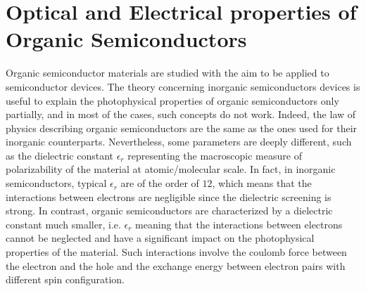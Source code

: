 \documentclass  [
  paper    = a4,
  BCOR     = 10mm,
  twoside,
  fontsize = 12pt,
  fleqn,
  toc      = bibnumbered,
  toc      = listofnumbered,
  numbers  = noendperiod,
  headings = normal,
  listof   = leveldown,
  version  = 3.03
]                                       {scrreprt}
\begin{document}
	\section{Optical and Electrical properties of Organic Semiconductors}\label{properties}
	
Organic semiconductor materials are studied with the aim to be applied to semiconductor devices. The theory concerning inorganic semiconductors devices is useful to explain the photophysical properties of organic semiconductors only partially, and in most of the cases, such concepts do not work. Indeed, the law of physics describing organic semiconductors are the same as the ones used for their inorganic counterparts. Nevertheless, some parameters are deeply different, such as the dielectric constant $\epsilon_r$ representing the macroscopic measure of polarizability of the material at atomic/molecular scale. In fact, in inorganic semiconductors, typical $\epsilon_r$ are of the order of $12$, which means that the interactions between electrons are negligible since the dielectric screening is strong. In contrast, organic semiconductors are characterized by a dielectric constant much smaller, i.e. $\epsilon_r$ meaning that the interactions between electrons cannot be neglected and have a significant impact on the photophysical properties of the material. Such interactions involve the coulomb force between the electron and the hole and the exchange energy between electron pairs with different spin configuration.\\
\end{document}
